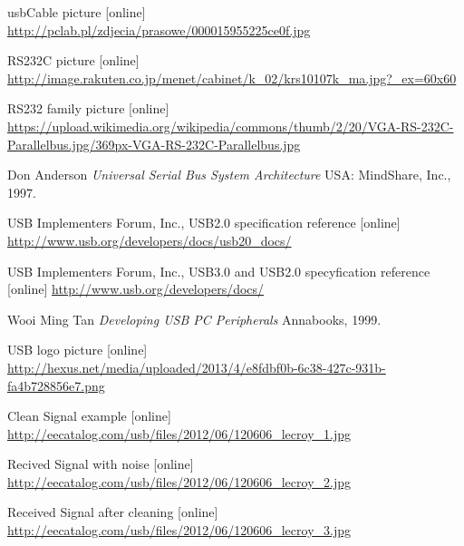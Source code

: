\documentclass{BscUS}
\begin{document}
\newpage
\begin{thebibliography}{1}
 usbCable picture [online] \\
\url{http://pclab.pl/zdjecia/prasowe/000015955225ce0f.jpg}

 RS232C picture [online]
\newline
\url{http://image.rakuten.co.jp/menet/cabinet/k_02/krs10107k_ma.jpg?_ex=60x60}

 RS232 family picture [online]
\newline
\url{https://upload.wikimedia.org/wikipedia/commons/thumb/2/20/VGA-RS-232C-Parallelbus.jpg/369px-VGA-RS-232C-Parallelbus.jpg}



 Don Anderson {\em Universal Serial Bus System Architecture } USA: MindShare, Inc., 1997.

 USB Implementers Forum, Inc., USB2.0 specification reference [online] 
\newline 
\url{http://www.usb.org/developers/docs/usb20_docs/}

 USB Implementers Forum, Inc., USB3.0 and USB2.0 specyfication reference [online] 
\newline 
\url{http://www.usb.org/developers/docs/}

 Wooi Ming Tan {\em Developing USB PC Peripherals } Annabooks, 1999.

 USB logo picture [online] \\
\url{http://hexus.net/media/uploaded/2013/4/e8fdbf0b-6c38-427c-931b-fa4b728856e7.png}

 Clean Signal example [online] \\
\url{http://eecatalog.com/usb/files/2012/06/120606_lecroy_1.jpg}

 Recived Signal with noise [online] \\
\url{http://eecatalog.com/usb/files/2012/06/120606_lecroy_2.jpg}

 Received Signal after cleaning [online]\\
\url{http://eecatalog.com/usb/files/2012/06/120606_lecroy_3.jpg}



\end{thebibliography}
\end{document}
